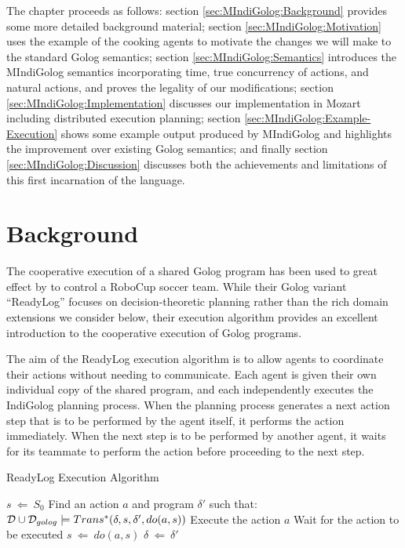 The chapter proceeds as follows: section \ref{sec:MIndiGolog:Background}
provides some more detailed background material; section \ref{sec:MIndiGolog:Motivation}
uses the example of the cooking agents to motivate the changes we
will make to the standard Golog semantics; section \ref{sec:MIndiGolog:Semantics}
introduces the MIndiGolog semantics incorporating time, true concurrency
of actions, and natural actions, and proves the legality of our modifications;
section \ref{sec:MIndiGolog:Implementation} discusses our implementation
in Mozart including distributed execution planning; section \ref{sec:MIndiGolog:Example-Execution}
shows some example output produced by MIndiGolog and highlights the
improvement over existing Golog semantics; and finally section \ref{sec:MIndiGolog:Discussion}
discusses both the achievements and limitations of this first incarnation
of the language.


\section{Background\label{sec:MIndiGolog:Background}}

The cooperative execution of a shared Golog program has been used
to great effect by \citet{Ferrein2005readylog} to control a RoboCup
soccer team. While their Golog variant {}``ReadyLog'' focuses on
decision-theoretic planning rather than the rich domain extensions
we consider below, their execution algorithm provides an excellent
introduction to the cooperative execution of Golog programs.

The aim of the ReadyLog execution algorithm is to allow agents to
coordinate their actions without needing to communicate. Each agent
is given their own individual copy of the shared program, and each
independently executes the IndiGolog planning process. When the planning
process generates a next action step that is to be performed by the
agent itself, it performs the action immediately. When the next step
is to be performed by another agent, it waits for its teammate to
perform the action before proceeding to the next step.

\begin{algorithm}[t]
\caption{ReadyLog Execution Algorithm}
\label{alg:readylog_exec}
\begin{algorithmic}[1]
\STATE $s\ \Leftarrow\ S_0$
  \STATE Find an action $a$ and program $\delta'$ such that:\\$\mathcal{D} \cup \mathcal{D}_{golog} \models Trans^*(\delta,s,\delta',do(a,s))$
    \STATE Execute the action $a$
  \ELSE
    \STATE Wait for the action to be executed
  \ENDIF
  \STATE $s\ \Leftarrow\ do(a,s)$ 
  \STATE $\delta\ \Leftarrow\ \delta'$
\ENDWHILE
\end{algorithmic} 
\end{algorithm}



